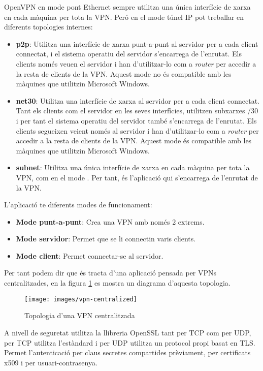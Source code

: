 OpenVPN en mode pont Ethernet sempre utilitza una única interfície de xarxa en cada màquina per tota la VPN. Peró en el mode túnel IP pot treballar en diferents topologies internes:
\begin{itemize}
\item \textbf{p2p}: Utilitza una interfície de xarxa punt-a-punt al servidor per a cada client connectat, i el sistema operatiu del servidor s'encarrega de l'enrutat. Els clients només veuen el servidor i han d'utilitzar-lo com a \emph{router} per accedir a la resta de clients de la VPN. Aquest mode no és compatible amb les màquines que utilitzin Microsoft Windows.
\item \textbf{net30}: Utilitza una interfície de xarxa al servidor per a cada client connectat. Tant els clients com el servidor en les seves interfícies, utilitzen subxarxes /30 i per tant el sistema operatiu del servidor també s'encarrega de l'enrutat. Els clients segueixen veient només al servidor i han d'utilitzar-lo com a \emph{router} per accedir a la resta de clients de la VPN. Aquest mode és compatible amb les màquines que utilitzin Microsoft Windows.
\item \textbf{subnet}: Utilitza una única interfície de xarxa en cada màquina per tota la VPN, com en el mode . Per tant, és l'aplicació qui s'encarrega de l'enrutat de la VPN.
\end{itemize}

L'aplicació te diferents modes de funcionament:
\begin{itemize}
\item \textbf{Mode punt-a-punt}: Crea una VPN amb només 2 extrems.
\item \textbf{Mode servidor}: Permet que se li connectin varis clients.
\item \textbf{Mode client}: Permet connectar-se al servidor.
\end{itemize}
Per tant podem dir que és tracta d'una aplicació pensada per VPNs centralitzades, en la figura \ref{F:vpn-centralized} es mostra un diagrama d'aquesta topologia.
\begin{figure}[htb]
\centering
\texttt{[image: images/vpn-centralized]}
\caption{Topologia d'una VPN centralitzada}
\label{F:vpn-centralized}
\end{figure}

A nivell de seguretat utilitza la llibreria OpenSSL tant per TCP com per UDP, per TCP utilitza l'estàndard  i per UDP utilitza un protocol propi basat en TLS. Permet l'autenticació per claus secretes compartides prèviament, per certificats x509 i per usuari-contrasenya.


